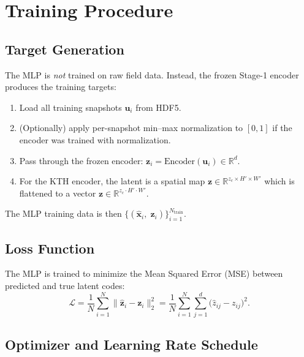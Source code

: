 \documentclass[11pt,a4paper]{article}
\newcommand{\R}{\mathbb{R}}
\newcommand{\bz}{\mathbf{z}}
\newcommand{\bx}{\mathbf{x}}
\begin{document}
\section{Training Procedure}

\subsection{Target Generation}

The MLP is \emph{not} trained on raw field data.  Instead, the frozen
Stage-1 encoder produces the training targets:
\begin{enumerate}[leftmargin=2em]
  \item Load all training snapshots $\mathbf{u}_i$ from HDF5.
  \item (Optionally) apply per-snapshot min--max normalization to $[0,1]$
    if the encoder was trained with normalization.
  \item Pass through the frozen encoder:
    $\bz_i = \mathrm{Encoder}(\mathbf{u}_i) \in \R^d$.
  \item For the KTH encoder, the latent is a spatial map
    $\bz \in \R^{z_c \times H' \times W'}$ which is flattened to a
    vector $\bz \in \R^{z_c \cdot H' \cdot W'}$.
\end{enumerate}

The MLP training data is then
$\{(\hat{\bx}_i,\; \bz_i)\}_{i=1}^{N_{\text{train}}}$.

\subsection{Loss Function}

The MLP is trained to minimize the Mean Squared Error (MSE) between
predicted and true latent codes:
\[
  \mathcal{L} = \frac{1}{N}\sum_{i=1}^{N}
  \|\hat{\bz}_i - \bz_i\|_2^2
  = \frac{1}{N}\sum_{i=1}^{N}\sum_{j=1}^{d}
  \bigl(\hat{z}_{ij} - z_{ij}\bigr)^2.
\]

\subsection{Optimizer and Learning Rate Schedule}
\end{document}
